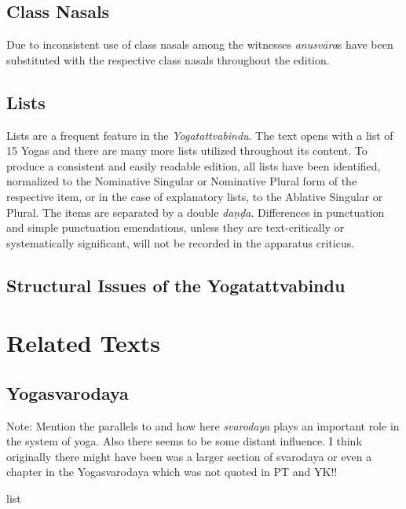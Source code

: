\section{Class Nasals}

Due to inconsistent use of class nasals among the witnesses \textit{anusvāra}s have been substituted with the respective class nasals throughout the edition.

\section{Lists}

Lists are a frequent feature in the \textit{Yogatattvabindu}. The text opens with a list of 15 Yogas and there are many more lists utilized throughout its content. To produce a consistent and easily readable edition, all lists have been identified, normalized to the Nominative Singular or Nominative Plural form of the respective item, or in the case of explanatory lists, to the Ablative Singular or Plural. The items are separated by a double \textit{daṇḍa}. Differences in punctuation and simple punctuation emendations, unless they are text-critically or systematically significant, will not be recorded in the apparatus criticus.
\clearpage

\section{Structural Issues of the Yogatattvabindu}
\label{structure}
\chapter{Related Texts}

\section{Yogasvarodaya}

Note: Mention the parallels to  and how here \textit{svarodaya} plays an important role in the system of yoga. Also there seems to be some distant influence. I think originally there might have been was a larger section of svarodaya or even a chapter in the Yogasvarodaya which was not quoted in PT and YK!!


list 

